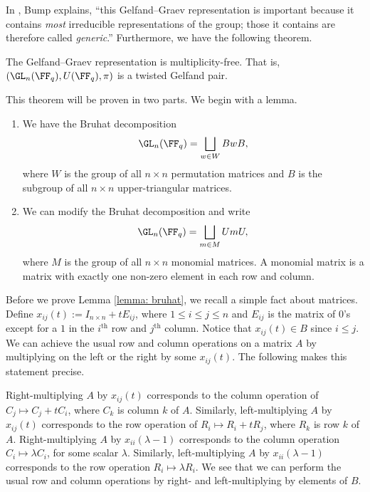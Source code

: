 In \cite{Bump13}, Bump explains, ``this Gelfand–Graev representation is important because it contains \emph{most} irreducible representations of the group; those it contains are therefore called \emph{generic}.'' Furthermore, we have the following theorem.
\begin{thm}\label{thm: gelf_graev}
	The Gelfand--Graev representation is multiplicity-free.
	That is, $(\GL_n(\FF_q),U(\FF_q),\pi)$ is a twisted Gelfand pair.
\end{thm}
This theorem will be proven in two parts.
We begin with a lemma.
\begin{lem}\label{lemma: bruhat}
	\begin{enumerate}[\itshape(i)]
		\item We have the Bruhat decomposition
		      \[
			      \GL_n(\FF_q) = \bigsqcup_{w\in W} BwB,
		      \]
		      where $W$ is the group of all $n\times n$ permutation matrices and $B$ is the subgroup of all $n\times n$ upper-triangular matrices.
		\item We can modify the Bruhat decomposition and write
		      \[
			      \GL_n(\FF_q) = \bigsqcup_{m\in M} UmU,
		      \]
		      where $M$ is the group of all $n\times n$ monomial matrices.
		      A monomial matrix is a matrix with exactly one non-zero element in each row and column.
	\end{enumerate}
\end{lem}
Before we prove Lemma \ref{lemma: bruhat}, we recall a simple fact about matrices.
Define $x_{ij}(t) := I_{n\times n} + tE_{ij}$, where $1\leq i\leq j\leq n$ and $E_{ij}$ is the matrix of $0$'s except for a $1$ in the $i^\text{th}$ row and $j^\text{th}$ column.
Notice that $x_{ij}(t)\in B$ since $i\leq j$.
We can achieve the usual row and column operations on a matrix $A$ by multiplying on the left or the right by some $x_{ij}(t)$.
The following makes this statement precise.

Right-multiplying $A$ by $x_{ij}(t)$ corresponds to the column operation of $C_j\mapsto C_j+tC_i$, where $C_k$ is column $k$ of $A$.
Similarly, left-multiplying $A$ by $x_{ij}(t)$ corresponds to the row operation of $R_i \mapsto R_i+tR_j$, where $R_k$ is row $k$ of $A$.
Right-multiplying $A$ by $x_{ii}(\lambda-1)$ corresponds to the column operation $C_i\mapsto \lambda C_i$, for some scalar $\lambda$.
Similarly, left-multiplying $A$ by $x_{ii}(\lambda-1)$ corresponds to the row operation $R_i\mapsto\lambda R_i$.
We see that we can perform the usual row and column operations by right- and left-multiplying by elements of $B$.


